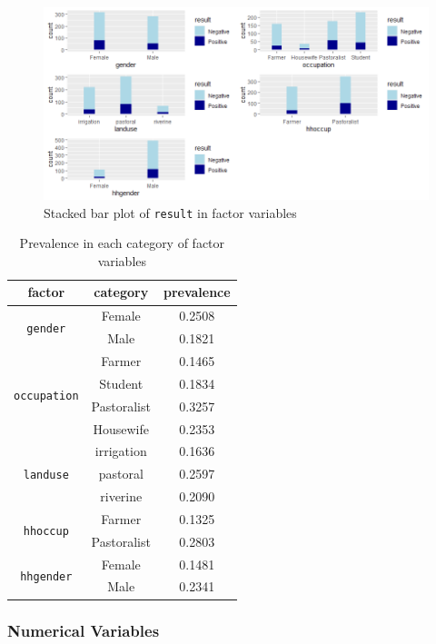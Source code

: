 \documentclass[11pt,twoside]{article}
\numberwithin{Theorem}{section}
\numberwithin{Definition}{section}
\numberwithin{Lemma}{section}
\numberwithin{Algorithm}{section}
\numberwithin{equation}{section}
\begin{document}
\begin{figure}[!h]
	\centering
	\includegraphics[width = \textwidth]{Images/factors.png}
	\caption{Stacked bar plot of \texttt{result} in factor variables}
	\label{fig:factor}
\end{figure}

\begin{table}[!h]
	\centering
	\begin{tabular}{|c|c|c|}
		\hline
		factor & category & prevalence \\
		\hline
		\multirow{2}{*}{\texttt{gender}} & Female & 0.2508 \\
		 & Male & 0.1821 \\
		\hline
		\multirow{4}{*}{\texttt{occupation}} & Farmer & 0.1465 \\
		 & Student & 0.1834 \\			
		 & Pastoralist & 0.3257 \\			
		 & Housewife & 0.2353 \\
		\hline
		\multirow{3}{*}{\texttt{landuse}} & irrigation & 0.1636 \\
		 & pastoral & 0.2597 \\
		 & riverine & 0.2090 \\
		\hline
		\multirow{2}{*}{\texttt{hhoccup}} & Farmer & 0.1325 \\
		 & Pastoralist & 0.2803 \\
		\hline
		\multirow{2}{*}{\texttt{hhgender}} & Female & 0.1481 \\
		 & Male & 0.2341 \\
		\hline
	\end{tabular}
	\caption{Prevalence in each category of factor variables}
	\label{tab:factor}
\end{table}

\subsubsection{Numerical Variables}
\end{document}

